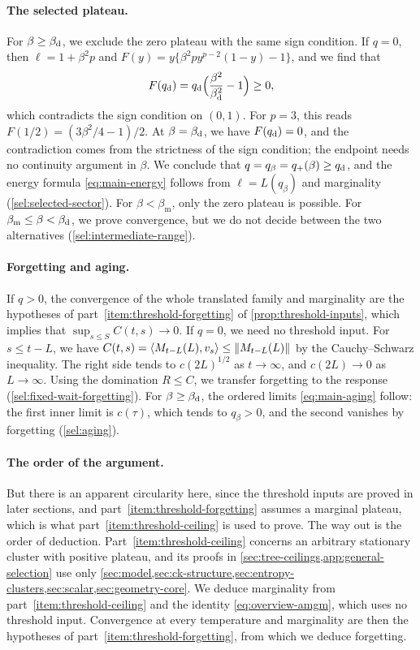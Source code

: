 \paragraph{The selected plateau.}
For $\beta\ge\beta_{\mathrm d}$, we exclude the zero plateau with the same sign condition. If $q=0$, then $\ell=1+\beta^2p$ and $F(y)=y\{\beta^2py^{p-2}(1-y)-1\}$, and we find that
\[
 F(q_{\mathrm d})=q_{\mathrm d}\Bigl(\frac{\beta^2}{\beta_{\mathrm d}^2}-1\Bigr)\ge0,
\]
which contradicts the sign condition on $(0,1)$. For $p=3$, this reads $F(1/2)=(3\beta^2/4-1)/2$. At $\beta=\beta_{\mathrm d}$, we have $F(q_{\mathrm d})=0$, and the contradiction comes from the strictness of the sign condition; the endpoint needs no continuity argument in $\beta$. We conclude that $q=q_\beta=q_+(\beta)\ge q_{\mathrm d}$, and the energy formula \eqref{eq:main-energy} follows from $\ell=L(q_\beta)$ and marginality (\cref{sel:selected-sector}). For $\beta<\beta_{\mathrm m}$, only the zero plateau is possible. For $\beta_{\mathrm m}\le\beta<\beta_{\mathrm d}$, we prove convergence, but we do not decide between the two alternatives (\cref{sel:intermediate-range}).

\paragraph{Forgetting and aging.}
If $q>0$, the convergence of the whole translated family and marginality are the hypotheses of part~\ref{item:threshold-forgetting} of \cref{prop:threshold-inputs}, which implies that $\sup_{s\le S}C(t,s)\to0$. If $q=0$, we need no threshold input. For $s\le t-L$, we have $C(t,s)=\left\langle M_{t-L}(L),v_s\right\rangle\le\lVert M_{t-L}(L)\rVert$ by the Cauchy--Schwarz inequality. The right side tends to $c(2L)^{1/2}$ as $t\to\infty$, and $c(2L)\to0$ as $L\to\infty$. Using the domination $R\le C$, we transfer forgetting to the response (\cref{sel:fixed-wait-forgetting}). For $\beta\ge\beta_{\mathrm d}$, the ordered limits \eqref{eq:main-aging} follow: the first inner limit is $c(\tau)$, which tends to $q_\beta>0$, and the second vanishes by forgetting (\cref{sel:aging}).

\paragraph{The order of the argument.}
But there is an apparent circularity here, since the threshold inputs are proved in later sections, and part~\ref{item:threshold-forgetting} assumes a marginal plateau, which is what part~\ref{item:threshold-ceiling} is used to prove. The way out is the order of deduction. Part~\ref{item:threshold-ceiling} concerns an arbitrary stationary cluster with positive plateau, and its proofs in \cref{sec:tree-ceilings,app:general-selection} use only \cref{sec:model,sec:ck-structure,sec:entropy-clusters,sec:scalar,sec:geometry-core}. We deduce marginality from part~\ref{item:threshold-ceiling} and the identity \eqref{eq:overview-amgm}, which uses no threshold input. Convergence at every temperature and marginality are then the hypotheses of part~\ref{item:threshold-forgetting}, from which we deduce forgetting.

